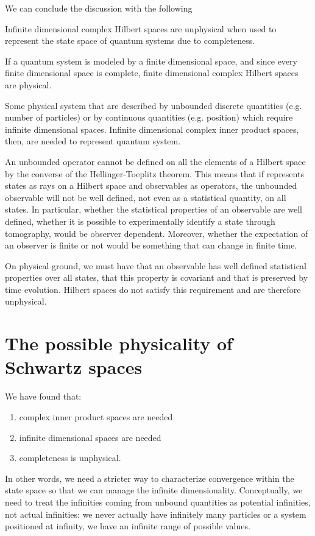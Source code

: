 \documentclass[10pt,twocolumn, nofootinbib]{revtex4-2}
\begin{document}
We can conclude the discussion with the following
\begin{prop}
	Infinite dimensional complex Hilbert spaces are unphysical when used to represent the state space of quantum systems due to completeness.
\end{prop}
\begin{justification}
	If a quantum system is modeled by a finite dimensional space, and since every finite dimensional space is complete, finite dimensional complex Hilbert spaces are physical.
	
	Some physical system that are described by unbounded discrete quantities (e.g. number of particles) or by continuous quantities (e.g. position) which require infinite dimensional spaces. Infinite dimensional complex inner product spaces, then, are needed to represent quantum system.

	An unbounded operator cannot be defined on all the elements of a Hilbert space by the converse of the Hellinger-Toeplitz theorem. This means that if represents states as rays on a Hilbert space and observables as operators, the unbounded observable will not be well defined, not even as a statistical quantity, on all states. In particular, whether the statistical properties of an observable are well defined, whether it is possible to experimentally identify a state through tomography, would be observer dependent. Moreover, whether the expectation of an observer is finite or not would be something that can change in finite time.
	
	On physical ground, we must have that an observable has well defined statistical properties over all states, that this property is covariant and that is preserved by time evolution. Hilbert spaces do not satisfy this requirement and are therefore unphysical.
\end{justification}

\section{The possible physicality of Schwartz spaces}

We have found that:
\begin{enumerate}
	\item complex inner product spaces are needed
	\item infinite dimensional spaces are needed
	\item completeness is unphysical.
\end{enumerate}
In other words, we need a stricter way to characterize convergence within the state space so that we can manage the infinite dimensionality. Conceptually, we need to treat the infinities coming from unbound quantities as potential infinities, not actual infinities: we never actually have infinitely many particles or a system positioned at infinity, we have an infinite range of possible values.
\end{document}
